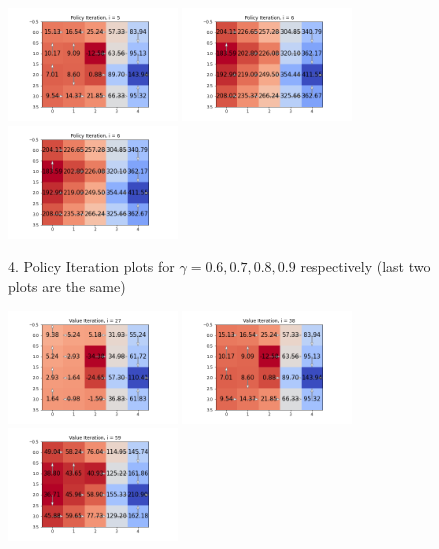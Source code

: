 \documentclass[submit]{harvardml}
\begin{document}
\begin{itemize}
\begin{figure}[h!]
        \includegraphics[width=0.4\textwidth]{HW6/Gamma_Policy_5.png}
        \includegraphics[width=0.4\textwidth]{HW6/Gamma_Policy_6.png}
        \includegraphics[width=0.4\textwidth]{HW6/Gamma_Policy_6.png}
        \caption{4. Policy Iteration plots for $\gamma = 0.6, 0.7, 0.8, 0.9$ respectively (last two plots are the same)}
    \end{figure}
    \begin{figure}[h!]
        \includegraphics[width=0.4\textwidth]{HW6/Gamma_Value_27.png}
        \includegraphics[width=0.4\textwidth]{HW6/Gamma_Value_38.png}
        \includegraphics[width=0.4\textwidth]{HW6/Gamma_Value_59.png}

\end{figure}
\end{itemize}
\end{document}

